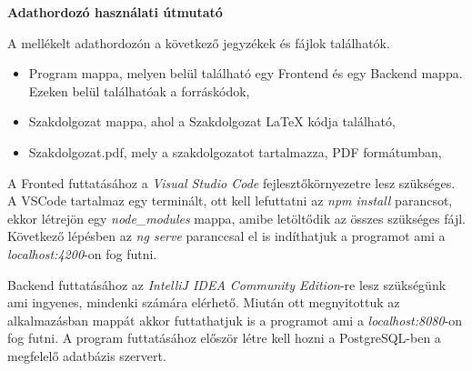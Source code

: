 \pagestyle{empty}

\noindent \textbf{\Large Adathordozó használati útmutató}

\vskip 1cm


A mellékelt adathordozón a következő jegyzékek és fájlok találhatók.

\begin{itemize}
\item Program mappa, melyen belül található egy Frontend és egy Backend mappa. Ezeken belül találhatóak a forráskódok,
\item Szakdolgozat mappa, ahol a Szakdolgozat LaTeX kódja található,
\item Szakdolgozat.pdf, mely a szakdolgozatot tartalmazza, PDF formátumban,
\end{itemize}

A Fronted futtatásához a \textit{Visual Studio Code} fejlesztőkörnyezetre lesz szükséges. A VSCode tartalmaz egy terminált, ott kell lefuttatni az \textit{npm install} parancsot, ekkor létrejön egy \textit{node\_modules} mappa, amibe letöltődik az összes szükséges fájl. Következő lépésben az \textit{ng serve} paranccsal el is indíthatjuk a programot ami a \textit{localhost:4200}-on fog futni.

Backend futtatásához az \textit{IntelliJ IDEA Community Edition}-re lesz szükségünk ami ingyenes, mindenki számára elérhető. Miután ott megnyitottuk az alkalmazásban mappát akkor futtathatjuk is a programot ami a \textit{localhost:8080}-on fog futni. A program futtatásához először létre kell hozni a PostgreSQL-ben a megfelelő adatbázis szervert.